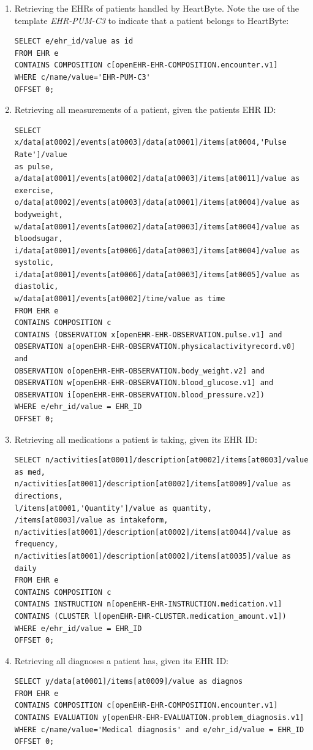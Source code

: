 \documentclass{article}
\begin{document}
\begin{enumerate}[label=(\roman*)]
\item Retrieving the EHRs of patients handled by HeartByte. Note the use of the template \emph{EHR-PUM-C3} to indicate that a patient belongs to HeartByte:
\begin{lstlisting}[language = AQL]
SELECT e/ehr_id/value as id
FROM EHR e
CONTAINS COMPOSITION c[openEHR-EHR-COMPOSITION.encounter.v1]
WHERE c/name/value='EHR-PUM-C3'
OFFSET 0;
\end{lstlisting}
    
\item Retrieving all measurements of a patient, given the patients EHR ID: 
\begin{lstlisting}[language = AQL]
SELECT 
x/data[at0002]/events[at0003]/data[at0001]/items[at0004,'Pulse Rate']/value 
as pulse,
a/data[at0001]/events[at0002]/data[at0003]/items[at0011]/value as exercise,
o/data[at0002]/events[at0003]/data[at0001]/items[at0004]/value as bodyweight,
w/data[at0001]/events[at0002]/data[at0003]/items[at0004]/value as bloodsugar,
i/data[at0001]/events[at0006]/data[at0003]/items[at0004]/value as systolic,
i/data[at0001]/events[at0006]/data[at0003]/items[at0005]/value as diastolic,
w/data[at0001]/events[at0002]/time/value as time
FROM EHR e
CONTAINS COMPOSITION c
CONTAINS (OBSERVATION x[openEHR-EHR-OBSERVATION.pulse.v1] and 
OBSERVATION a[openEHR-EHR-OBSERVATION.physicalactivityrecord.v0] and 
OBSERVATION o[openEHR-EHR-OBSERVATION.body_weight.v2] and 
OBSERVATION w[openEHR-EHR-OBSERVATION.blood_glucose.v1] and 
OBSERVATION i[openEHR-EHR-OBSERVATION.blood_pressure.v2]) 
WHERE e/ehr_id/value = EHR_ID
OFFSET 0;
\end{lstlisting}
    
\item Retrieving all medications a patient is taking, given its EHR ID:
\begin{lstlisting}[language = AQL]
SELECT n/activities[at0001]/description[at0002]/items[at0003]/value as med,
n/activities[at0001]/description[at0002]/items[at0009]/value as directions,
l/items[at0001,'Quantity']/value as quantity,
/items[at0003]/value as intakeform,
n/activities[at0001]/description[at0002]/items[at0044]/value as frequency,
n/activities[at0001]/description[at0002]/items[at0035]/value as daily
FROM EHR e
CONTAINS COMPOSITION c
CONTAINS INSTRUCTION n[openEHR-EHR-INSTRUCTION.medication.v1] 
CONTAINS (CLUSTER l[openEHR-EHR-CLUSTER.medication_amount.v1]) 
WHERE e/ehr_id/value = EHR_ID
OFFSET 0;
\end{lstlisting}

\clearpage
\item Retrieving all diagnoses a patient has, given its EHR ID:
\begin{lstlisting}[language = AQL]
SELECT y/data[at0001]/items[at0009]/value as diagnos
FROM EHR e
CONTAINS COMPOSITION c[openEHR-EHR-COMPOSITION.encounter.v1]
CONTAINS EVALUATION y[openEHR-EHR-EVALUATION.problem_diagnosis.v1] 
WHERE c/name/value='Medical diagnosis' and e/ehr_id/value = EHR_ID
OFFSET 0;
\end{lstlisting}
\end{enumerate}
\end{document}
